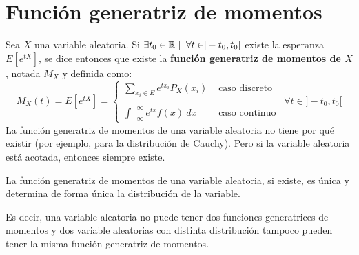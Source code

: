 \section{Función generatriz de momentos}

Sea $X$ una variable aleatoria. Si $\exists t_0 \in \mathbb R \mid \; \forall t \in ]-t_0,t_0[$ existe la esperanza
$E[e^{tX}]$,
se dice entonces que existe la \textbf{función generatriz de momentos de $X$}, notada $M_X$ y definida como:
$$M_X(t)=E[e^{tX}] = \left\{ \begin{array}{ll}
    \sum\limits_{x_i \in E} e^{tx_i} P_X(x_i) & \mbox{ caso discreto} \\ \\
    \displaystyle \int_{-\infty}^{+\infty} e^{tx}f(x)~dx  & \mbox{ caso continuo}
  \end{array} \right.~~\forall t \in ]-t_0, t_0[$$
La función generatriz de momentos de una variable aleatoria no tiene por qué existir (por ejemplo, para la
distribución de Cauchy). Pero si la variable aleatoria está acotada, entonces siempre existe.

\begin{teo}[de unicidad]
    La función generatriz de momentos de una variable aleatoria, si existe, es única y determina de forma única la distribución de la variable.
\end{teo}

Es decir, una variable aleatoria no puede tener dos funciones generatrices de momentos y dos variable aleatorias con distinta distribución tampoco pueden tener la misma función generatriz de momentos.

